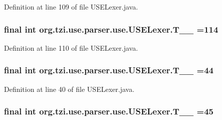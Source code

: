 Definition at line 109 of file U\-S\-E\-Lexer.\-java.

\hypertarget{classorg_1_1tzi_1_1use_1_1parser_1_1use_1_1_u_s_e_lexer_a07da65aa65ac3a9ec130603e0faceebb}{
\subsubsection[{T\-\_\-\-\_\-114}]{\setlength{\rightskip}{0pt plus 5cm}final int org.\-tzi.\-use.\-parser.\-use.\-U\-S\-E\-Lexer.\-T\-\_\-\-\_ =114\hspace{0.3cm}{\ttfamily [static]}}}\label{classorg_1_1tzi_1_1use_1_1parser_1_1use_1_1_u_s_e_lexer_a07da65aa65ac3a9ec130603e0faceebb}


Definition at line 110 of file U\-S\-E\-Lexer.\-java.

\hypertarget{classorg_1_1tzi_1_1use_1_1parser_1_1use_1_1_u_s_e_lexer_afaa12a131ef1037ba54024f5ccb6d56b}{
\subsubsection[{T\-\_\-\-\_\-44}]{\setlength{\rightskip}{0pt plus 5cm}final int org.\-tzi.\-use.\-parser.\-use.\-U\-S\-E\-Lexer.\-T\-\_\-\-\_ =44\hspace{0.3cm}{\ttfamily [static]}}}\label{classorg_1_1tzi_1_1use_1_1parser_1_1use_1_1_u_s_e_lexer_afaa12a131ef1037ba54024f5ccb6d56b}


Definition at line 40 of file U\-S\-E\-Lexer.\-java.

\hypertarget{classorg_1_1tzi_1_1use_1_1parser_1_1use_1_1_u_s_e_lexer_adc4a9f2e0f159c9ddfef8a05a8f0b03c}{
\subsubsection[{T\-\_\-\-\_\-45}]{\setlength{\rightskip}{0pt plus 5cm}final int org.\-tzi.\-use.\-parser.\-use.\-U\-S\-E\-Lexer.\-T\-\_\-\-\_ =45\hspace{0.3cm}{\ttfamily [static]}}}\label{classorg_1_1tzi_1_1use_1_1parser_1_1use_1_1_u_s_e_lexer_adc4a9f2e0f159c9ddfef8a05a8f0b03c}


